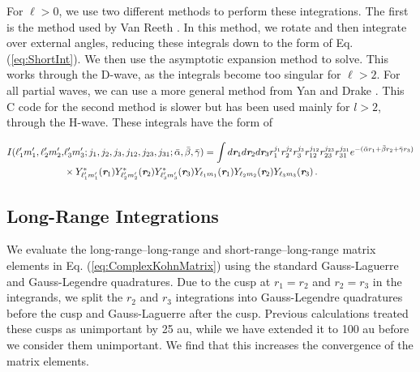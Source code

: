\documentclass[preprint,showpacs,preprintnumbers,amsmath,amssymb,longbibliography,pra,aps]{revtex4-1}
\begin{document}
For $\ell > 0$, we use two different methods to perform these integrations. The first is the method used by Van Reeth \cite{VanReethThesis}. In this method, we rotate and then integrate over external angles, reducing these integrals down to the form of Eq. (\ref{eq:ShortInt}). We then use the asymptotic expansion method \cite{Drake1995} to solve. This works through the D-wave, as the integrals become too singular for $\ell > 2$. For all partial waves, we can use a more general method from Yan and Drake \cite{Yan1997}. This C code for the second method is slower but has been used mainly for $l > 2$, through the H-wave. These integrals have the form of
\begin{widetext}
\begin{align}
\label{eq:ShortIntGen}
\nonumber I(\ell_1^\prime m_1^\prime, \ell_2^\prime m_2^\prime, &\ell_3^\prime m_3^\prime; j_1,j_2,j_3,j_{12},j_{23},j_{31}; \bar{\alpha}, \bar{\beta}, \bar{\gamma}) = \int d \textit{\textbf{r}}_1 d \textit{\textbf{r}}_2 d \textit{\textbf{r}}_3
r_1^{j_1} r_2^{j_2} r_3^{j_3} r_{12}^{j_{12}}
r_{23}^{j_{23}} r_{31}^{j_{31}}
e^{-(\bar{\alpha} r_1 + \bar{\beta} r_2 + \bar{\gamma} r_3)} \\
& \times Y_{\ell_1^\prime m_1^\prime}^* (\textit{\textbf{r}}_1) Y_{\ell_2^\prime m_2^\prime}^* (\textit{\textbf{r}}_2) Y_{\ell_3^\prime m_3^\prime}^* (\textit{\textbf{r}}_3) Y_{\ell_1 m_1} (\textit{\textbf{r}}_1) Y_{\ell_2 m_2} (\textit{\textbf{r}}_2) Y_{\ell_3 m_3} (\textit{\textbf{r}}_3)\, .
\end{align}
\end{widetext}

\subsection{Long-Range Integrations}
\label{sec:LongInt}
We evaluate the long-range--long-range and short-range--long-range matrix elements in Eq. (\ref{eq:ComplexKohnMatrix}) using the standard Gauss-Laguerre and Gauss-Legendre quadratures. Due to the cusp at $r_1 = r_2$ and $r_2 = r_3$ in the integrands, we split the $r_2$ and $r_3$ integrations into Gauss-Legendre quadratures before the cusp and Gauss-Laguerre after the cusp. Previous calculations \cite{VanReeth2003,VanReeth2004} treated these cusps as unimportant by 25 au, while we have extended it to 100 au before we consider them unimportant. We find that this increases the convergence of the matrix elements.
\end{document}

